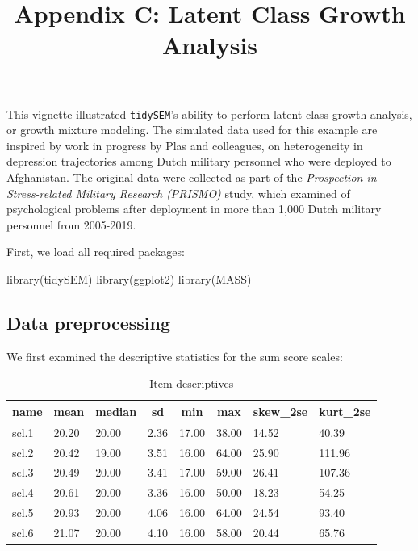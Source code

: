 \documentclass[
  man,floatsintext]{apa6}
\title{Appendix C: Latent Class Growth Analysis}
\author{\phantom{0}}
\date{}
\affiliation{\phantom{0}}
\newenvironment{Shaded}{\begin{snugshade}}{\end{snugshade}}
\newcommand{\FunctionTok}[1]{\textcolor[rgb]{0.00,0.00,0.00}{#1}}
\newcommand{\NormalTok}[1]{#1}
\begin{document}
\maketitle

This vignette illustrated \texttt{tidySEM}'s ability to perform latent class
growth analysis, or growth mixture modeling. The simulated data used for
this example are inspired by work in progress by Plas and colleagues, on
heterogeneity in depression trajectories among Dutch military personnel
who were deployed to Afghanistan. The original data were collected as
part of the \emph{Prospection in Stress-related Military Research (PRISMO)}
study, which examined of psychological problems after deployment in more
than 1,000 Dutch military personnel from 2005-2019.

First, we load all required packages:

\begin{Shaded}
\begin{Highlighting}[]
\FunctionTok{library}\NormalTok{(tidySEM)}
\FunctionTok{library}\NormalTok{(ggplot2)}
\FunctionTok{library}\NormalTok{(MASS)}
\end{Highlighting}
\end{Shaded}

\hypertarget{data-preprocessing}{%
\subsection{Data preprocessing}\label{data-preprocessing}}

We first examined the descriptive statistics for the sum score scales:

\begin{table}[tbp]

\begin{center}
\begin{threeparttable}

\caption{\label{tab:unnamed-chunk-2}Item descriptives}

\begin{tabular}{llllllll}
\toprule
name & \multicolumn{1}{c}{mean} & \multicolumn{1}{c}{median} & \multicolumn{1}{c}{sd} & \multicolumn{1}{c}{min} & \multicolumn{1}{c}{max} & \multicolumn{1}{c}{skew\_2se} & \multicolumn{1}{c}{kurt\_2se}\\
\midrule
scl.1 & 20.20 & 20.00 & 2.36 & 17.00 & 38.00 & 14.52 & 40.39\\
scl.2 & 20.42 & 19.00 & 3.51 & 16.00 & 64.00 & 25.90 & 111.96\\
scl.3 & 20.49 & 20.00 & 3.41 & 17.00 & 59.00 & 26.41 & 107.36\\
scl.4 & 20.61 & 20.00 & 3.36 & 16.00 & 50.00 & 18.23 & 54.25\\
scl.5 & 20.93 & 20.00 & 4.06 & 16.00 & 64.00 & 24.54 & 93.40\\
scl.6 & 21.07 & 20.00 & 4.10 & 16.00 & 58.00 & 20.44 & 65.76\\
\bottomrule
\end{tabular}

\end{threeparttable}
\end{center}

\end{table}
\end{document}
